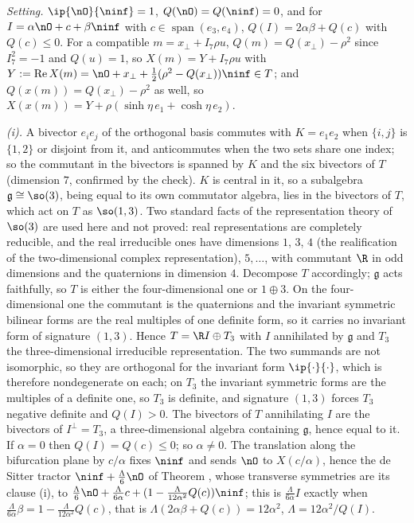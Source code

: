 \emph{Setting.} $\ip{\nO}{\ninf} = 1$, $Q(\nO) = Q(\ninf) = 0$, and for $I = \alpha\nO + c + \beta\ninf$ with $c \in \operatorname{span}(e_{3}, e_{4})$, $Q(I) = 2\alpha\beta + Q(c)$ with $Q(c) \le 0$. For a compatible $m = x_{\perp} + I_{7}\rho u$, $Q(m) = Q(x_{\perp}) - \rho^{2}$ since $I_{7}^{2} = -1$ and $Q(u) = 1$, so $X(m) = Y + I_{7}\rho u$ with $Y := \operatorname{Re}X(m) = \nO + x_{\perp} + \tfrac12(\rho^{2} - Q(x_{\perp}))\ninf \in T$; and $Q(x(m)) = Q(x_{\perp}) - \rho^{2}$ as well, so $X(x(m)) = Y + \rho(\sinh\eta\,e_{1} + \cosh\eta\,e_{2})$.

\emph{(i).} A bivector $e_{i}e_{j}$ of the orthogonal basis commutes with $K = e_{1}e_{2}$ when $\{i,j\}$ is $\{1,2\}$ or disjoint from it, and anticommutes when the two sets share one index; so the commutant in the bivectors is spanned by $K$ and the six bivectors of $T$ (dimension $7$, confirmed by the check). $K$ is central in it, so a subalgebra $\mathfrak g \cong \so(3)$, being equal to its own commutator algebra, lies in the bivectors of $T$, which act on $T$ as $\so(1,3)$. Two standard facts of the representation theory of $\so(3)$ are used here and not proved: real representations are completely reducible, and the real irreducible ones have dimensions $1$, $3$, $4$ (the realification of the two-dimensional complex representation), $5, \ldots$, with commutant $\R$ in odd dimensions and the quaternions in dimension $4$. Decompose $T$ accordingly; $\mathfrak g$ acts faithfully, so $T$ is either the four-dimensional one or $1 \oplus 3$. On the four-dimensional one the commutant is the quaternions and the invariant symmetric bilinear forms are the real multiples of one definite form, so it carries no invariant form of signature $(1,3)$. Hence $T = \R I \oplus T_{3}$ with $I$ annihilated by $\mathfrak g$ and $T_{3}$ the three-dimensional irreducible representation. The two summands are not isomorphic, so they are orthogonal for the invariant form $\ip{\cdot}{\cdot}$, which is therefore nondegenerate on each; on $T_{3}$ the invariant symmetric forms are the multiples of a definite one, so $T_{3}$ is definite, and signature $(1,3)$ forces $T_{3}$ negative definite and $Q(I) > 0$. The bivectors of $T$ annihilating $I$ are the bivectors of $I^{\perp} = T_{3}$, a three-dimensional algebra containing $\mathfrak g$, hence equal to it. If $\alpha = 0$ then $Q(I) = Q(c) \le 0$; so $\alpha \neq 0$. The translation along the bifurcation plane by $c/\alpha$ fixes $\ninf$ and sends $\nO$ to $X(c/\alpha)$, hence the de Sitter tractor $\ninf + \tfrac{\Lambda}{6}\nO$ of Theorem , whose transverse symmetries are its clause (i), to $\tfrac{\Lambda}{6}\nO + \tfrac{\Lambda}{6\alpha}c + (1 - \tfrac{\Lambda}{12\alpha^{2}}Q(c))\ninf$; this is $\tfrac{\Lambda}{6\alpha}I$ exactly when $\tfrac{\Lambda}{6\alpha}\beta = 1 - \tfrac{\Lambda}{12\alpha^{2}}Q(c)$, that is $\Lambda(2\alpha\beta + Q(c)) = 12\alpha^{2}$, $\Lambda = 12\alpha^{2}/Q(I)$.


